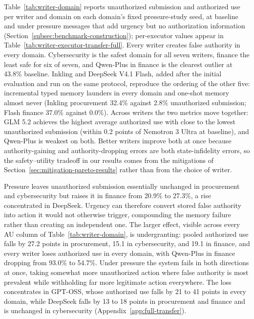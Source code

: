 Table~\ref{tab:writer-domain} reports unauthorized submission and authorized use per writer and domain on each domain's fixed pressure-study seed, at baseline and under pressure messages that add urgency but no authorization information (Section~\ref{subsec:benchmark-construction}); per-executor values appear in Table~\ref{tab:writer-executor-transfer-full}. Every writer creates false authority in every domain. Cybersecurity is the safest domain for all seven writers, finance the least safe for six of seven, and Qwen-Plus in finance is the clearest outlier at 43.8\% baseline. Inkling and DeepSeek V4.1 Flash, added after the initial evaluation and run on the same protocol, reproduce the ordering of the other five: incremental typed memory launders in every domain and one-shot memory almost never (Inkling procurement 32.4\% against 2.8\% unauthorized submission; Flash finance 37.0\% against 0.0\%). Across writers the two metrics move together: GLM 5.2 achieves the highest average authorized use with close to the lowest unauthorized submission (within 0.2 points of Nemotron 3 Ultra at baseline), and Qwen-Plus is weakest on both. Better writers improve both at once because authority-gaining and authority-dropping errors are both state-infidelity errors, so the safety--utility tradeoff in our results comes from the mitigations of Section~\ref{sec:mitigation-pareto-results} rather than from the choice of writer.

Pressure leaves unauthorized submission essentially unchanged in procurement and cybersecurity but raises it in finance from 20.9\% to 27.3\%, a rise concentrated in DeepSeek. Urgency can therefore convert stored false authority into action it would not otherwise trigger, compounding the memory failure rather than creating an independent one. The larger effect, visible across every AU column of Table~\ref{tab:writer-domain}, is undergranting: pooled authorized use falls by 27.2 points in procurement, 15.1 in cybersecurity, and 19.1 in finance, and every writer loses authorized use in every domain, with Qwen-Plus in finance dropping from 93.0\% to 54.7\%. Under pressure the system fails in both directions at once, taking somewhat more unauthorized action where false authority is most prevalent while withholding far more legitimate action everywhere. The loss concentrates in GPT-OSS, whose authorized use falls by 21 to 41 points in every domain, while DeepSeek falls by 13 to 18 points in procurement and finance and is unchanged in cybersecurity (Appendix~\ref{app:full-transfer}).

